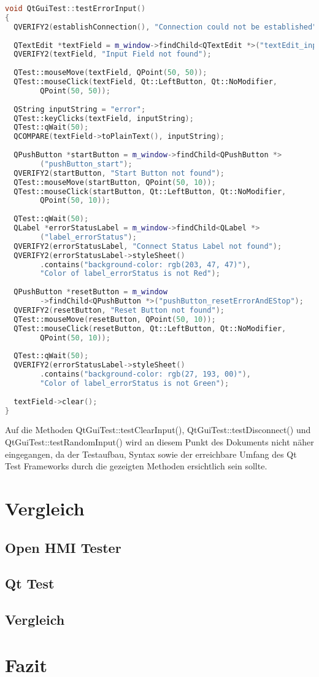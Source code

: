 		\begin{lstlisting}[language=C++]
void QtGuiTest::testErrorInput()
{    
  QVERIFY2(establishConnection(), "Connection could not be established");
	
  QTextEdit *textField = m_window->findChild<QTextEdit *>("textEdit_input");
  QVERIFY2(textField, "Input Field not found");
	
  QTest::mouseMove(textField, QPoint(50, 50));
  QTest::mouseClick(textField, Qt::LeftButton, Qt::NoModifier,
        QPoint(50, 50));
	
  QString inputString = "error";
  QTest::keyClicks(textField, inputString);
  QTest::qWait(50);
  QCOMPARE(textField->toPlainText(), inputString);
	
  QPushButton *startButton = m_window->findChild<QPushButton *>
        ("pushButton_start");
  QVERIFY2(startButton, "Start Button not found");
  QTest::mouseMove(startButton, QPoint(50, 10));
  QTest::mouseClick(startButton, Qt::LeftButton, Qt::NoModifier, 
        QPoint(50, 10));
	
  QTest::qWait(50);
  QLabel *errorStatusLabel = m_window->findChild<QLabel *>
        ("label_errorStatus");
  QVERIFY2(errorStatusLabel, "Connect Status Label not found");
  QVERIFY2(errorStatusLabel->styleSheet()
        .contains("background-color: rgb(203, 47, 47)"), 
        "Color of label_errorStatus is not Red");
	
  QPushButton *resetButton = m_window
        ->findChild<QPushButton *>("pushButton_resetErrorAndEStop");
  QVERIFY2(resetButton, "Reset Button not found");
  QTest::mouseMove(resetButton, QPoint(50, 10));
  QTest::mouseClick(resetButton, Qt::LeftButton, Qt::NoModifier, 
        QPoint(50, 10));
	
  QTest::qWait(50);
  QVERIFY2(errorStatusLabel->styleSheet()
        .contains("background-color: rgb(27, 193, 00)"), 
        "Color of label_errorStatus is not Green");
	
  textField->clear();
}
		\end{lstlisting}
	
		Auf die Methoden QtGuiTest::testClearInput(), QtGuiTest::testDisconnect() und 	QtGuiTest::testRandomInput() wird an diesem Punkt des Dokuments nicht näher eingegangen, da der Testaufbau, Syntax sowie der erreichbare Umfang des Qt Test Frameworks durch die gezeigten Methoden ersichtlich sein sollte.
		
\chapter{Vergleich}

	\section{Open HMI Tester}
	\section{Qt Test}
	\section{Vergleich}

\chapter{Fazit}